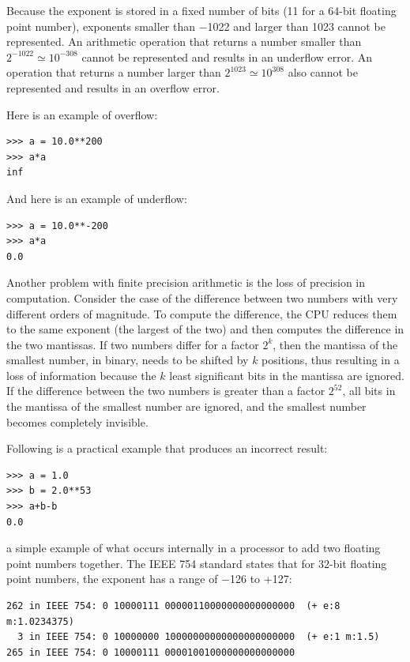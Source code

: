 \documentclass[justified,sixbynine]{tufte-book}
\theoremstyle{plain}%
\theoremstyle{definition}
\theoremstyle{remark}
\begin{document}
\begin{fullwidth}
Because the exponent is stored in a fixed number of bits (11 for a 64-bit floating point number), exponents smaller than $-$1022 and larger than 1023 cannot be represented. An arithmetic operation that returns a number smaller than $2^{-1022} \simeq 10^{-308}$ cannot be represented and results in an underflow error. An operation that returns a number larger than $2^{1023}\simeq 10^{308}$ also cannot be represented and results in an overflow error.

Here is an example of overflow:

\begin{lstlisting}
>>> a = 10.0**200
>>> a*a
inf
\end{lstlisting}

And here is an example of underflow:

\begin{lstlisting}
>>> a = 10.0**-200
>>> a*a
0.0
\end{lstlisting}

Another problem with finite precision arithmetic is the loss of precision in computation. Consider the case of the difference between two numbers with very different orders of magnitude. To compute the difference, the CPU reduces them to the same exponent (the largest of the two) and then computes the difference in the two mantissas. If two numbers differ for a factor $2^k$, then the mantissa of the smallest number, in binary, needs to be shifted by $k$ positions, thus resulting in a loss of information because the $k$ least significant bits in the mantissa are ignored. If the difference between the two numbers is greater than a factor $2^{52}$, all bits in the mantissa of the smallest number are ignored, and the smallest number becomes completely invisible.

Following is a practical example that produces an incorrect result:

\begin{lstlisting}
>>> a = 1.0
>>> b = 2.0**53
>>> a+b-b
0.0
\end{lstlisting}

a simple example of what occurs internally in a processor to add two floating point numbers together. The IEEE 754 standard states that for 32-bit floating point numbers, the exponent has a range of $-$126 to +127:
\begin{lstlisting}
262 in IEEE 754: 0 10000111 00000110000000000000000  (+ e:8 m:1.0234375)
  3 in IEEE 754: 0 10000000 10000000000000000000000  (+ e:1 m:1.5)
265 in IEEE 754: 0 10000111 00001001000000000000000
\end{lstlisting}


\end{fullwidth}
\end{document}
